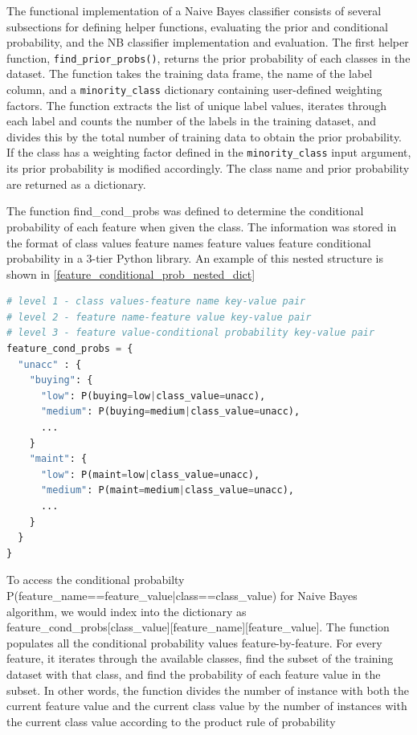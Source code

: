 \documentclass[a4paper]{article}
\begin{document}
The functional implementation of a Naive Bayes classifier consists of several subsections for defining helper functions, evaluating the prior and conditional probability, and the NB classifier implementation and evaluation. The first helper function, \lstinline{find_prior_probs()}, returns the prior probability of each classes in the dataset. The function takes the training data frame, the name of the label column, and a \lstinline{minority_class} dictionary containing user-defined weighting factors. The function extracts the list of unique label values, iterates through each label and counts the number of the labels in the training dataset, and divides this by the total number of training data to obtain the prior probability. If the class has a weighting factor defined in the \lstinline{minority_class} input argument, its prior probability is modified accordingly. The class name and prior probability are returned as a dictionary.

The function find\_cond\_probs was defined to determine the conditional probability of each feature when given the class. The information was stored in the format of class values \> feature names \> feature values \> feature conditional probability in a 3-tier Python library. An example of this nested structure is shown in \autoref{feature_conditional_prob_nested_dict}

\begin{lstlisting}[language=Python, label={feature_conditional_prob_nested_dict}, caption={Pseudo-code of the nested dictionary structure containing the conditional probabilities for P(feature value|class)}]
# level 1 - class values-feature name key-value pair
# level 2 - feature name-feature value key-value pair
# level 3 - feature value-conditional probability key-value pair
feature_cond_probs = {                    
  "unacc" : {                             
    "buying": {                           
      "low": P(buying=low|class_value=unacc),
      "medium": P(buying=medium|class_value=unacc),
      ...
    }
    "maint": {
      "low": P(maint=low|class_value=unacc),
      "medium": P(maint=medium|class_value=unacc),
      ...
    }
  }
}
\end{lstlisting}

To access the conditional probabilty P(feature\_name==feature\_value|class==class\_value) for Naive Bayes algorithm, we would index into the dictionary as feature\_cond\_probs[class\_value][feature\_name][feature\_value]. The function populates all the conditional probability values feature-by-feature. For every feature, it iterates through the available classes, find the subset of the training dataset with that class, and find the probability of each feature value in the subset. In other words, the function divides the number of instance with both the current feature value and the current class value by the number of instances with the current class value according to the product rule of probability
\end{document}
